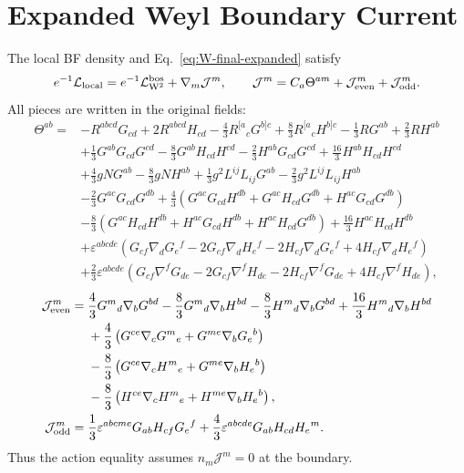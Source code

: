 \documentclass[11pt]{article}
\newcommand{\cL}{\mathcal L}
\newcommand{\eps}{\varepsilon}
\newcommand{\Weyl}{\mathrm W}
\begin{document}
\appendix
\section{Expanded Weyl Boundary Current}
\label{app:Wcurrent}

The local BF density and Eq.~\eqref{eq:W-final-expanded} satisfy
\begin{equation}
e^{-1}\cL_{\rm local}=e^{-1}\cL_{\Weyl^2}^{\rm bos}
+\nabla_m\mathcal J^m,
\qquad
\mathcal J^m=C_a\Theta^{am}+\mathcal J_{\rm even}^m
+\mathcal J_{\rm odd}^m.
\end{equation}
All pieces are written in the original fields:
\begin{align}
\Theta^{ab}={}&-R^{abcd}G_{cd}+2R^{abcd}H_{cd}
-\frac43R^{[a}{}_cG^{b]c}+\frac83R^{[a}{}_cH^{b]c}
-\frac13RG^{ab}+\frac23RH^{ab}
\nonumber\\
&+\frac13G^{ab}G_{cd}G^{cd}-\frac83G^{ab}H_{cd}H^{cd}
-\frac23H^{ab}G_{cd}G^{cd}+\frac{16}{3}H^{ab}H_{cd}H^{cd}
\nonumber\\
&+\frac43gNG^{ab}-\frac83gNH^{ab}
+\frac13g^2L^{ij}L_{ij}G^{ab}
-\frac23g^2L^{ij}L_{ij}H^{ab}
\nonumber\\
&-\frac23G^{ac}G_{cd}G^{db}
+\frac43\left(G^{ac}G_{cd}H^{db}+G^{ac}H_{cd}G^{db}
+H^{ac}G_{cd}G^{db}\right)
\nonumber\\
&-\frac83\left(G^{ac}H_{cd}H^{db}+H^{ac}G_{cd}H^{db}
+H^{ac}H_{cd}G^{db}\right)
+\frac{16}{3}H^{ac}H_{cd}H^{db}
\nonumber\\
&+\eps^{abcde}\left(G_{cf}\nabla_dG_e{}^f
-2G_{cf}\nabla_dH_e{}^f-2H_{cf}\nabla_dG_e{}^f
+4H_{cf}\nabla_dH_e{}^f\right)
\nonumber\\
&+\frac23\eps^{abcde}\left(G_{cf}\nabla^fG_{de}
-2G_{cf}\nabla^fH_{de}-2H_{cf}\nabla^fG_{de}
+4H_{cf}\nabla^fH_{de}\right),
\end{align}
\begin{align}
\mathcal J_{\rm even}^m={}&
\frac43G^m{}_d\nabla_bG^{bd}-\frac83G^m{}_d\nabla_bH^{bd}
-\frac83H^m{}_d\nabla_bG^{bd}
+\frac{16}{3}H^m{}_d\nabla_bH^{bd}
\nonumber\\
&+\frac43\left(G^{ce}\nabla_cG^m{}_e+G^{me}\nabla_bG_e{}^b\right)
\nonumber\\
&-\frac83\left(G^{ce}\nabla_cH^m{}_e+G^{me}\nabla_bH_e{}^b\right)
\nonumber\\
&-\frac83\left(H^{ce}\nabla_cH^m{}_e+H^{me}\nabla_bH_e{}^b\right),\\
\mathcal J_{\rm odd}^m={}&
\frac13\eps^{abcme}G_{ab}H_{cf}G_e{}^f
+\frac43\eps^{abcde}G_{ab}H_{cd}H_e{}^m.
\end{align}
Thus the action equality assumes $n_m\mathcal J^m=0$ at the boundary.
\end{document}
